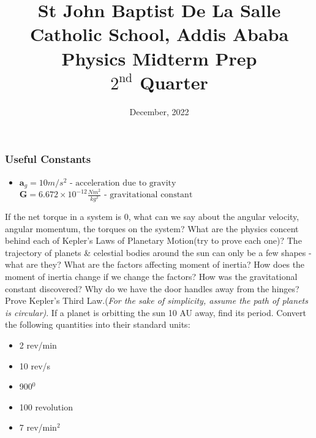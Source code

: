 \documentclass[13pt,addpoints]{exam}
\date{December, 2022}
\begin{document}
	\title{St John Baptist De La Salle Catholic School, Addis Ababa\\
		\large Physics Midterm Prep \\
		$2^\text{nd}$ Quarter}
	\maketitle
	\begin{center}
		\subsubsection*{Useful Constants}
		\begin{itemize}
			\item $\textbf{a}_g=10m/s^2\text{  - acceleration due to gravity}$\textbf{~}$\textbf{G} = 6.672\times10^{-12}\frac{Nm^2}{kg^2}\text{  - gravitational constant}$
		\end{itemize}
		
	\end{center}
				\begin{questions}
					\question If the net torque in a system is 0, what can we say about the angular velocity, angular momentum, the torques on the system? 
					\question What are the physics concent behind each of Kepler's Laws of Planetary Motion(try to prove each one)? 
					\question The trajectory of planets \& celestial bodies around the sun can only be a few shapes - what are they? 
					\question What are the factors affecting moment of inertia? How does the moment of inertia change if we change the factors?
					\question How was the gravitational constant discovered? 
					\question Why do we have the door handles away from the hinges?
					\question Prove Kepler's Third Law.(\textit{For the sake of simplicity, assume the path of planets is circular)}.
					\question If a planet is orbitting the sun 10 AU away, find its period.
					\question Convert the following quantities into their standard units:
					\begin{itemize}
						\item 2 rev/min
						\item 10 rev/s
						\item 900$^0$
						\item 100 revolution
						\item 7 rev/min$^2$
					\end{itemize}
				\end{questions}
			
\end{document}

